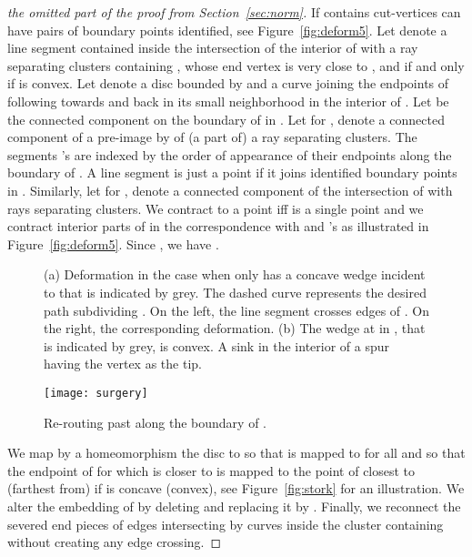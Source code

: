\documentclass{llncs}
\begin{document}
\begin{proof}[the omitted part of the proof from Section~\ref{sec:norm}]
 If  contains cut-vertices  can have pairs of boundary points identified, see Figure~\ref{fig:deform5}.
Let  denote  a line segment contained inside the intersection of the interior of  with a ray separating clusters containing , whose end vertex is very close to , and  if and only if  is convex. Let  denote a disc bounded by  and a curve 
joining the endpoints of  following  towards  and back in its small neighborhood in the interior of .
Let  be the connected component on the boundary of  in .
Let  for , denote a connected component of a pre-image by  of (a part of) a ray separating clusters. The segments 
's are indexed by the order of appearance of their endpoints along the boundary of .
A line segment  is just a point if it joins identified boundary points in .
Similarly, let  for , denote a connected component of the 
intersection of  with rays separating clusters.
We contract  to a point iff  is a single point
and we  contract  interior parts of  in the correspondence with  and 's as illustrated in Figure~\ref{fig:deform5}. Since , we have .

 
 

 \begin{figure}[h]
  \centering
\centering
{}
    	\hspace{3px}

\caption{(a) Deformation in the case when only  has a concave wedge incident to  that is indicated by grey.
The dashed curve represents the desired path subdividing .
On the left, the line segment  crosses  edges of . 
On the right, the corresponding deformation. (b) The wedge at 
in , that is indicated by grey, is convex.  A sink   in the interior of a spur having the vertex 
as the tip.}
\end{figure}




\begin{figure}
 \centering
\texttt{[image: surgery]}
\caption{Re-routing  past  along the boundary of .}
\label{fig:deform8} 
\end{figure}

We map by a homeomorphism  the disc  to  so that 
is mapped to  for all 
and so that the endpoint  of  for which  is closer to  is mapped to the point of  closest to (farthest from) 
 if  is concave (convex), see Figure~\ref{fig:stork} for an illustration.
We alter the embedding of  by deleting  and replacing it
by .
Finally, we  reconnect the severed end pieces of edges intersecting  by curves inside the cluster containing  without
creating any edge crossing. 




\end{proof}
\end{document}
